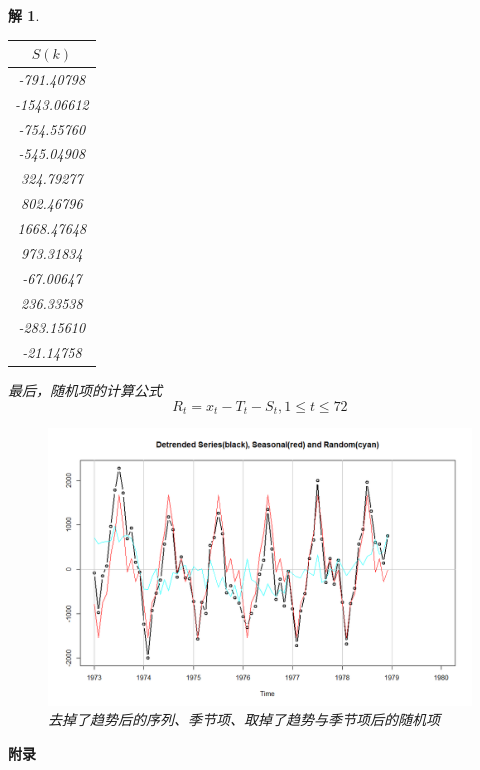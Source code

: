 \documentclass[11pt,a4paper]{ctexart}
\newtheorem*{solution}{解}
\begin{document}
\begin{enumerate}
\begin{solution}
\begin{itemize}
\begin{table}[H]   %
 \centering
\begin{tabular}{c}
\toprule[1.5pt]
$S(k)$  \\
\midrule[1pt]
-791.40798\\
 -1543.06612  \\
 -754.55760 \\
  -545.04908 \\
   324.79277\\
 802.46796 \\
  1668.47648  \\
   973.31834 \\
     -67.00647 \\
       236.33538\\
 -283.15610  \\
  -21.14758\\
\bottomrule[1.5pt]
\end{tabular}
\end{table}
最后，随机项的计算公式
\begin{equation}
R_t=x_t-T_t-S_t,1\leq t\leq72
\end{equation}
\begin{figure}[H]
	\centering
	\includegraphics[width=12cm]{5.png}  
	\caption{去掉了趋势后的序列、季节项、取掉了趋势与季节项后的随机项}
\end{figure}

\end{itemize}




\end{solution}
\end{enumerate}
\centering\textbf{\Large 附录}
\end{document}

